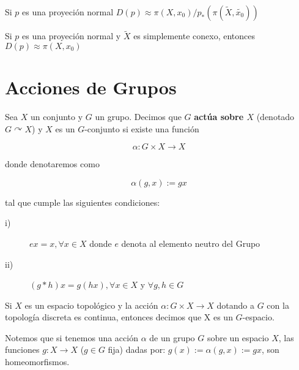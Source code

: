 \begin{corollary}
Si $p$ es una proyeci\'on normal $D(p) \approx \pi(X,x_0)/p_*(\pi (\widetilde{X},\widetilde{x_0}))$
\end{corollary}

\begin{corollary}
Si $p$ es una proyeci\'on normal y $\widetilde{X}$ es simplemente conexo, entonces $D(p) \approx \pi(X,x_0)$
\end{corollary}


\section{Acciones de Grupos}


\begin{definition}

Sea $X$  un conjunto y $G$ un grupo. Decimos que $G$ \textbf{act\'ua sobre $X$} (denotado $G \curvearrowright X$) y $X$ es un $G$-conjunto si existe una funci\'on

$$ \alpha :G \times X \rightarrow X$$

donde denotaremos como 

$$ \alpha(g,x):= gx$$

tal que cumple las siguientes condiciones:\\

\begin{description}
\item[i)]$ex=x, \forall x \in X$ donde $e$ denota al elemento neutro del Grupo

\item[ii)]$(g*h)x=g(hx), \forall x \in X$ y $\forall g,h \in G$\\
\end{description}

Si $X$ es un espacio topol\'ogico y la acci\'on $ \alpha :G \times X \rightarrow X$ dotando a $G$ con la topolog\'ia discreta es continua, entonces decimos que X es un $G$-espacio.\\
\end{definition}

Notemos que si tenemos una acci\'on $\alpha$ de un grupo $G$ sobre un espacio $X$, las funciones $g:X \rightarrow X$ ($g \in G$ fija) dadas por: $g(x):= \alpha (g,x):=gx$, son homeomorfismos.

